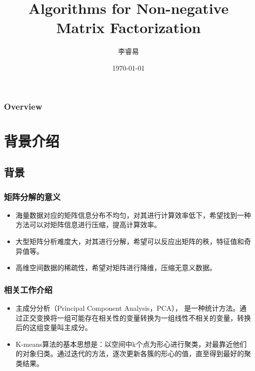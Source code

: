 \documentclass[UTF8,mathserif]{beamer}
\title[Short title]{Algorithms for Non-negative Matrix Factorization } %
\author{李睿易} %
\institute[UCAS] %
{
University of Chinese Academy of Sciences \\ %
2018E8013261056 \\
\medskip
\textit{ruiyilii@163.com} %
}
\date{\today} %
\begin{document}
\begin{frame}
\titlepage %
\end{frame}

\begin{frame}
\frametitle{Overview} %
\tableofcontents %
\end{frame}


\section{背景介绍}

\subsection{背景}

\begin{frame}
    \frametitle{矩阵分解的意义}
    \begin{itemize}
      \item 海量数据对应的矩阵信息分布不均匀，对其进行计算效率低下，希望找到一种方法可以对矩阵信息进行压缩，提高计算效率。
      \item 大型矩阵分析难度大，对其进行分解，希望可以反应出矩阵的秩，特征值和奇异值等。
      \item 高维空间数据的稀疏性，希望对矩阵进行降维，压缩无意义数据。
    \end{itemize}
\end{frame}

\begin{frame}
    \frametitle{相关工作介绍}
    \begin{itemize}
        \item 主成分分析（Principal Component Analysis，PCA）， 是一种统计方法。通过正交变换将一组可能存在相关性的变量转换为一组线性不相关的变量，转换后的这组变量叫主成分。
        \item K-means算法的基本思想是：以空间中k个点为形心进行聚类，对最靠近他们的对象归类。通过迭代的方法，逐次更新各簇的形心的值，直至得到最好的聚类结果。
    \end{itemize}
\end{frame}
\end{document}
